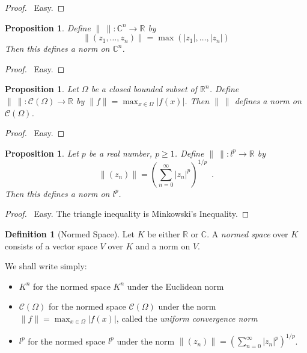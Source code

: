 \documentclass{book}
\let\qed\relax
\newtheorem{prop}[ax]{Proposition}
\theoremstyle{definition}
\newtheorem{df}[ax]{Definition}
\begin{document}
\begin{proof}
\pf\ Easy. \qed
\end{proof}

\begin{prop}
Define $\|\ \| : \mathbb{C}^n \rightarrow \mathbb{R}$ by
\[ \| (z_1, \ldots, z_n) \| = \max(|z_1|, \ldots, |z_n|) \]
Then this defines a norm on $\mathbb{C}^n$.
\end{prop}

\begin{proof}
\pf\ Easy. \qed
\end{proof}

\begin{prop}
Let $\Omega$ be a closed bounded subset of $\mathbb{R}^n$. Define $\|\ \| : \mathcal{C}(\Omega) \rightarrow \mathbb{R}$ by $\| f \| = \max_{x \in \Omega} |f(x)|$. Then $\|\ \|$ defines a norm on $\mathcal{C}(\Omega)$.
\end{prop}

\begin{proof}
\pf\ Easy. \qed
\end{proof}

\begin{prop}
Let $p$ be a real number, $p \geq 1$. Define $\|\ \| : l^p \rightarrow \mathbb{R}$ by
\[ \| (z_n) \| = \left( \sum_{n=0}^\infty |z_n|^p \right)^{1/p} \enspace . \]
Then this defines a norm on $l^p$.
\end{prop}

\begin{proof}
\pf\ Easy. The triangle inequality is Minkowski's Inequality. \qed
\end{proof}

\begin{df}[Normed Space]
Let $K$ be either $\mathbb{R}$ or $\mathbb{C}$. A \emph{normed space} over $K$ consists of a vector space $V$ over $K$ and a norm on $V$.
\end{df}

We shall write simply:
\begin{itemize}
\item $K^n$ for the normed space $K^n$ under the Euclidean norm
\item $\mathcal{C}(\Omega)$ for the normed space $\mathcal{C}(\Omega)$ under the norm $\| f \| = \max_{x \in \Omega} |f(x)|$, called the \emph{uniform convergence norm}
\item $l^p$ for the normed space $l^p$ under the norm $\| (z_n) \| = \left( \sum_{n=0}^\infty |z_n|^p \right)^{1/p}$.
\end{itemize}
\end{document}
